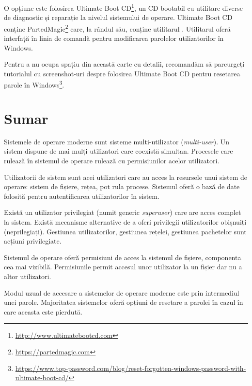 O opțiune este folosirea Ultimate Boot
CD\footnote{\url{http://www.ultimatebootcd.com}}, un CD bootabil cu utilitare
diverse de diagnostic și reparație la nivelul sistemului de operare. Ultimate
Boot CD conține PartedMagic\footnote{\url{https://partedmagic.com}} care, la
rândul său, conține utilitarul . Utilitarul  oferă interfață în
linia de comandă pentru modificarea parolelor utilizatorilor în Windows.

Pentru a nu ocupa spațiu din această carte cu detalii, recomandăm să parcurgeți
tutorialul cu screenshot-uri despre folosirea Ultimate Boot CD pentru resetarea parole în Windows\footnote{\url{https://www.top-password.com/blog/reset-forgotten-windows-password-with-ultimate-boot-cd/}}.

\section{Sumar}
\label{sec:user:summary}

Sistemele de operare moderne sunt sisteme multi-utilizator (\textit{multi-user}). Un sistem dispune de mai mulți utilizatori care coexistă simultan. Procesele care rulează în sistemul de operare rulează cu permisiunilor acelor utilizatori.

Utilizatorii de sistem sunt acei utilizatori care au acces la resursele unui sistem de operare: sistem de fișiere, rețea, pot rula procese. Sistemul oferă o bază de date folosită pentru autentificarea utilizatorilor în sistem.

Există un utilizator privilegiat (numit generic \textit{superuser}) care are acces complet la sistem. Există mecanisme alternative de a oferi privilegii utilizatorilor obișnuiți (neprilegiați). Gestiunea utilizatorilor, gestiunea rețelei, gestiunea pachetelor sunt acțiuni privilegiate.

Sistemul de operare oferă permisiuni de acces la sistemul de fișiere, componenta cea mai vizibilă. Permisiunile permit accesul unor utilizator la un fișier dar nu a altor utilizatori.

Modul uzual de accesare a sistemelor de operare moderne este prin intermediul unei parole. Majoritatea sistemelor oferă opțiuni de resetare a parolei în cazul în care aceasta este pierdută.
